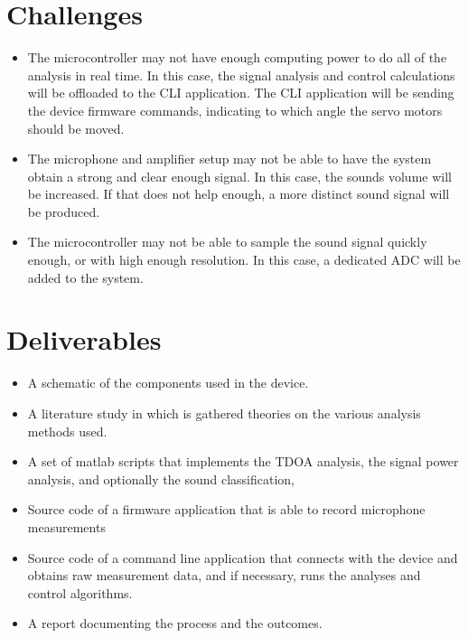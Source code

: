 \documentclass[a4paper]{article}
\begin{document}
\section{Challenges}
\begin{itemize}
    \item The microcontroller may not have enough computing power to do all of the analysis in real time. In this case, the signal analysis and control calculations will be offloaded to the CLI application. The CLI application will be sending the device firmware commands, indicating to which angle the servo motors should be moved.
    \item The microphone and amplifier setup may not be able to have the system obtain a strong and clear enough signal. In this case, the sounds volume will be increased. If that does not help enough, a more distinct sound signal will be produced.
    \item The microcontroller may not be able to sample the sound signal quickly enough, or with high enough resolution. In this case, a dedicated ADC will be added to the system.

\end{itemize}
\section{Deliverables}
\begin{itemize}
    \item A schematic of the components used in the device.
    \item A literature study in which is gathered theories on the various analysis methods used.
    \item A set of matlab scripts that implements the TDOA analysis, the signal power analysis, and optionally the sound classification,
    \item Source code of a firmware application that is able to record microphone measurements
    \item Source code of a command line application that connects with the device and obtains raw measurement data, and if necessary, runs the analyses and control algorithms.
    \item A report documenting the process and the outcomes.
\end{itemize}
\end{document}
